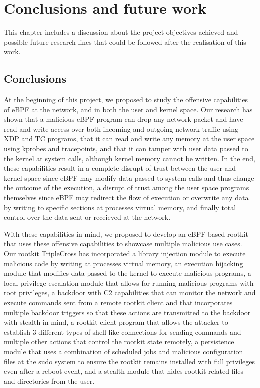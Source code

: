 \chapter{Conclusions and future work}
This chapter includes a discussion about the project objectives achieved and possible future research lines that could be followed after the realisation of this work.

\section{Conclusions}
At the beginning of this project, we proposed to study the offensive capabilities of eBPF at the network, and in both the user and kernel space. Our research has shown that a malicious eBPF program can drop any network packet and have read and write access over both incoming and outgoing network traffic using XDP and TC programs, that it can read and write any memory at the user space using kprobes and tracepoints, and that it can tamper with user data passed to the kernel at system calls, although kernel memory cannot be written. In the end, these capabilities result in a complete disrupt of trust between the user and kernel space since eBPF may modify data passed to system calls and thus change the outcome of the execution, a disrupt of trust among the user space programs themselves since eBPF may redirect the flow of execution or overwrite any data by writing to specific sections at processes virtual memory, and finally total control over the data sent or receieved at the network.

With these capabilities in mind, we proposed to develop an eBPF-based rootkit that uses these offensive capabilities to showcase multiple malicious use cases. Our rootkit TripleCross has incorporated a library injection module to execute malicious code by writing at processes virtual memory, an execution hijacking module that modifies data passed to the kernel to execute malicious programs, a local privilege escalation module that allows for running malicious programs with root privileges, a backdoor with C2 capabilities that can monitor the network and execute commands sent from a remote rootkit client and that incorporates multiple backdoor triggers so that these actions are transmitted to the backdoor with stealth in mind, a rootkit client program that allows the attacker to establish 3 different types of shell-like connections for sending commands and multiple other actions that control the rootkit state remotely, a persistence module that uses a combination of scheduled jobs and malicious configuration files at the sudo system to ensure the rootkit remains installed with full privileges even after a reboot event, and a stealth module that hides rootkit-related files and directories from the user.

